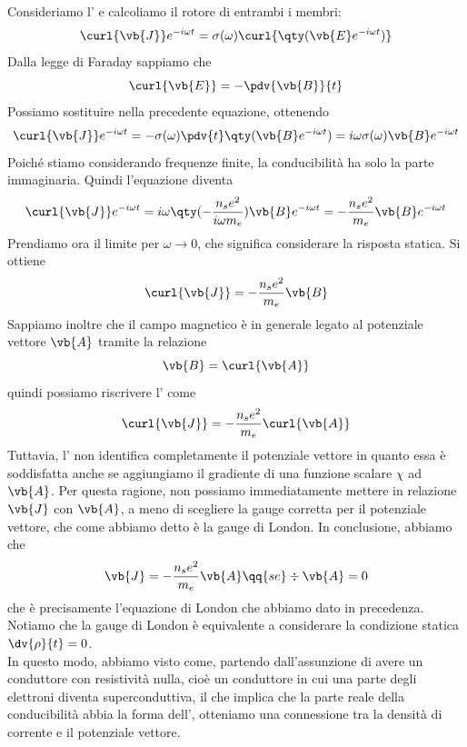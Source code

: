Consideriamo l' e calcoliamo il rotore di entrambi i membri:
\begin{equation*}
   \curl{\vb{J}} e^{-i\omega t}
   =\sigma(\omega) \curl{ \qty( \vb{E} e^{-i\omega t } ) }
\end{equation*}
Dalla legge di Faraday sappiamo che
\begin{equation*}
   \curl{\vb{E}}
   =-\pdv{\vb{B}}{t}
\end{equation*}
Possiamo sostituire nella precedente equazione, ottenendo
\begin{equation*}
   \curl{\vb{J}} e^{-i\omega t}
   =-\sigma(\omega) \pdv{t} \qty( \vb{B} e^{-i\omega t} )
   =i\omega \sigma(\omega) \vb{B} e^{-i\omega t}
\end{equation*}
Poiché stiamo considerando frequenze finite, la conducibilità ha solo la parte immaginaria. Quindi l'equazione diventa
\begin{equation*}
   \curl{\vb{J}} e^{-i\omega t}
   =i\omega \qty( - \frac{n_s e^2}{i \omega m_e} ) \vb{B} e^{-i\omega t}
   =-\frac{n_s e^2}{m_e} \vb{B} e^{-i\omega t}
\end{equation*}
Prendiamo ora il limite per $\omega \to 0$, che significa considerare la risposta statica. Si ottiene
\begin{equation}
   \curl{\vb{J}}
   =-\frac{n_s e^2}{m_e} \vb{B}
   \label{eq:relazione_J_B}
\end{equation}
Sappiamo inoltre che il campo magnetico è in generale legato al potenziale vettore $\vb{A}$ tramite la relazione
\begin{equation}
   \vb{B}=\curl{\vb{A}}
   \label{eq:relazione_B_A}
\end{equation}
quindi possiamo riscrivere l' come
\begin{equation*}
   \curl{\vb{J}}
   =-\frac{n_s e^2}{m_e} \curl{\vb{A}}
\end{equation*}
Tuttavia, l' non identifica completamente il potenziale vettore in quanto essa è soddisfatta anche se aggiungiamo il gradiente di una funzione scalare $\chi$ ad $\vb{A}$. Per questa ragione, non possiamo immediatamente mettere in relazione $\vb{J}$ con $\vb{A}$, a meno di scegliere la gauge corretta per il potenziale vettore, che come abbiamo detto è la gauge di London. In conclusione, abbiamo che
\begin{equation*}
   \vb{J}
   =-\frac{n_s e^2}{m_e} \vb{A}
   \qq{se}
   \div{\vb{A}}=0
\end{equation*}
che è precisamente l'equazione di London che abbiamo dato in precedenza. Notiamo che la gauge di London è equivalente a considerare la condizione statica $\dv{\rho}{t}=0$.\\
In questo modo, abbiamo visto come, partendo dall'assunzione di avere un conduttore con resistività nulla, cioè un conduttore in cui una parte degli elettroni diventa superconduttiva, il che implica che la parte reale della conducibilità abbia la forma dell', otteniamo una connessione tra la densità di corrente e il potenziale vettore.
